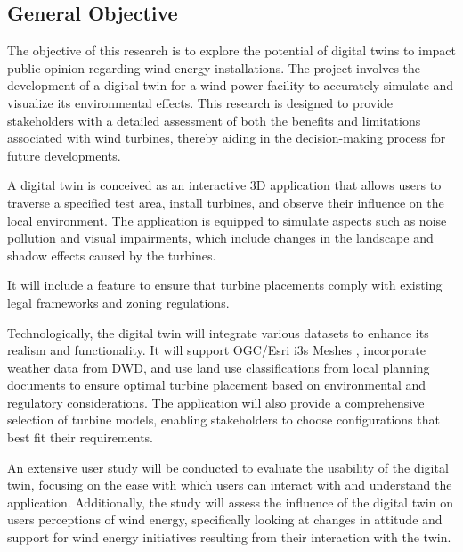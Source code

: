 \documentclass[11pt, titlepage, a4paper]{scrartcl}
\begin{document}
\begin{linenumbers}
    \subsection{General Objective}
    The objective of this research is to explore the potential of digital twins to impact public opinion regarding wind energy installations. The project involves the development of a digital twin for a wind power facility to accurately simulate and visualize its environmental effects. This research is designed to provide stakeholders with a detailed assessment of both the benefits and limitations associated with wind turbines, thereby aiding in the decision-making process for future developments.

    A digital twin is conceived as an interactive 3D application that allows users to traverse a specified test area, install turbines, and observe their influence on the local environment. The application is equipped to simulate aspects such as noise pollution and visual impairments, which include changes in the landscape and shadow effects caused by the turbines.

    It will include a feature to ensure that turbine placements comply with existing legal frameworks and zoning regulations.

    Technologically, the digital twin will integrate various datasets to enhance its realism and functionality. It will support OGC/Esri i3s Meshes \cite{esriincI3sspec}, incorporate weather data from DWD, and use land use classifications from local planning documents %
    to ensure optimal turbine placement based on environmental and regulatory considerations. The application will also provide a comprehensive selection of turbine models, enabling stakeholders to choose configurations that best fit their requirements.

    An extensive user study will be conducted to evaluate the usability of the digital twin, focusing on the ease with which users can interact with and understand the application. Additionally, the study will assess the influence of the digital twin on users perceptions of wind energy, specifically looking at changes in attitude and support for wind energy initiatives resulting from their interaction with the twin.






\end{linenumbers}
\end{document}

